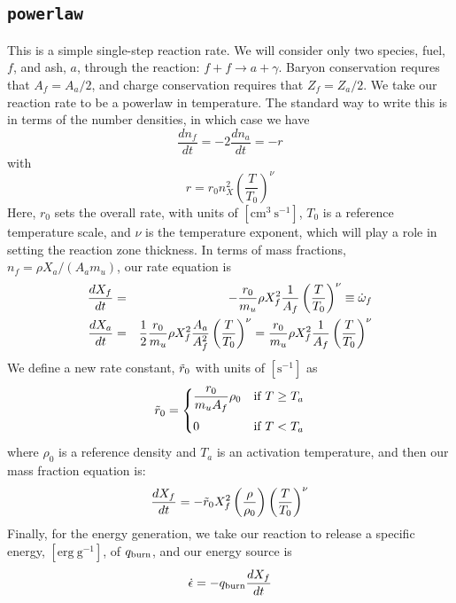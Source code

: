\subsection{{\tt powerlaw}}

This is a simple single-step reaction rate.
We will consider only two species, fuel, $f$, and ash, $a$, through
the reaction: $f + f \rightarrow a + \gamma$.  Baryon conservation
requres that $A_f = A_a/2$, and charge conservation requires that $Z_f
= Z_a/2$.  We take
our reaction rate to be a powerlaw in temperature.  The standard way
to write this is in terms of the number densities, in which case we
have
\begin{equation}
\frac{d n_f}{d t} = -2\frac{d n_a}{d t} = -r
\end{equation}
with
\begin{equation}
  r = r_0 n_X^2 \left( \frac{T}{T_0} \right )^\nu
\end{equation}
Here, $r_0$ sets the overall rate, with units of
$[\mathrm{cm^3~s^{-1}}]$, $T_0$ is a reference temperature scale, and
$\nu$ is the temperature exponent, which will play a role in setting
the reaction zone thickness.  In terms of mass fractions, $n_f = \rho
X_a / (A_a m_u)$, our rate equation is
\begin{eqnarray}
 \frac{dX_f}{dt} &=& - \frac{r_0}{m_u} \rho X_f^2 \frac{1}{A_f} \left (\frac{T}{T_0}\right)^\nu \equiv \dot\omega_f \label{eq:Xf} \\
 \frac{dX_a}{dt} &=& \frac{1}{2}\frac{r_0}{m_u} \rho X_f^2 \frac{A_a}{A_f^2} \left (\frac{T}{T_0}\right)^\nu = \frac{r_0}{m_u} \rho X_f^2 \frac{1}{A_f} \left (\frac{T}{T_0}\right)^\nu  \label{eq:Xa}
\end{eqnarray}
We define a new rate constant, $\tilde{r}_0$ with units of $[\mathrm{s^{-1}}]$ as
\begin{equation}
\tilde{r}_0 =  \begin{cases}
  \dfrac{r_0}{m_u A_f} \rho_0 & \text{if $T \ge T_a$} \\[1em]
  0                          & \text{if $T < T_a$}
 \end{cases}
\end{equation}
where $\rho_0$ is a reference density and $T_a$ is an activation
temperature, and then our mass fraction equation is:
\begin{equation}
\frac{dX_f}{dt} = -\tilde{r}_0 X_f^2 \left (\frac{\rho}{\rho_0} \right ) \left ( \frac{T}{T_0}\right )^\nu
\end{equation}
Finally, for the
energy generation, we take our reaction to release a specific energy,
$[\mathrm{erg~g^{-1}}]$, of $q_\mathrm{burn}$, and our energy source is
\begin{equation}
\dot{\epsilon} = -q_\mathrm{burn} \frac{dX_f}{dt}
\end{equation}

